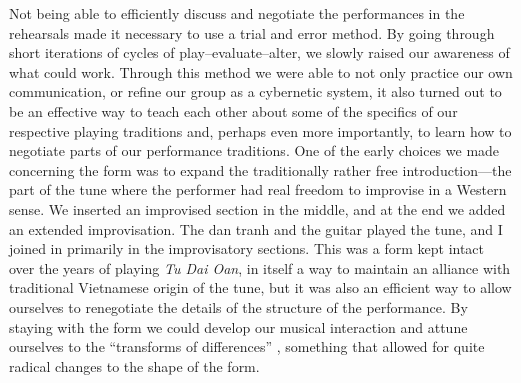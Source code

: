 \documentclass[a4paper]{article}
\begin{document}

Not being able to efficiently discuss and negotiate the performances in the rehearsals made it necessary to use a trial and error method. By going through short iterations of cycles of play–evaluate–alter, we slowly raised our awareness of what could work. Through this method we were able to not only practice our own communication, or refine our group as a cybernetic system, it also turned out to be an effective way to teach each other about some of the specifics of our respective playing traditions and, perhaps even more importantly, to learn how to negotiate parts of our performance traditions. One of the early choices we made concerning the form was to expand the traditionally rather free introduction—the part of the tune where the performer had real freedom to improvise in a Western sense. We inserted an improvised section in the middle, and at the end we added an extended improvisation. The dan tranh and the guitar played the tune, and I joined in primarily in the improvisatory sections. This was a form kept intact over the years of playing \emph{Tu Dai Oan}, in itself a way to maintain an alliance with traditional Vietnamese origin of the tune, but it was also an efficient way to allow ourselves to renegotiate the details of the structure of the performance. By staying with the form we could develop our musical interaction and attune ourselves to the ``transforms of differences'' \autocite[318]{bateson72:steps}, something that allowed for quite radical changes to the shape of the form.
\end{document}
